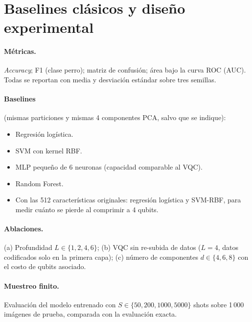 \documentclass[11pt,letterpaper]{article}
\begin{document}
\section{Baselines clásicos y diseño experimental}
\paragraph{Métricas.} \emph{Accuracy}; F1 (clase perro); matriz de confusión; área bajo la curva
ROC (AUC). Todas se reportan con media y desviación estándar sobre tres semillas.

\paragraph{Baselines} (mismas particiones y mismas 4 componentes PCA, salvo que se indique):
\begin{itemize}[leftmargin=*]
\item Regresión logística.
\item SVM con kernel RBF.
\item MLP pequeño de 6 neuronas (capacidad comparable al VQC).
\item Random Forest.
\item Con las 512 características originales: regresión logística y SVM-RBF, para medir cuánto se
pierde al comprimir a 4 qubits.
\end{itemize}

\paragraph{Ablaciones.} (a) Profundidad $L\in\{1,2,4,6\}$; (b) VQC sin re-subida de datos
($L=4$, datos codificados solo en la primera capa); (c) número de componentes $d\in\{4,6,8\}$ con
el costo de qubits asociado.

\paragraph{Muestreo finito.} Evaluación del modelo entrenado con $S\in\{50,200,1000,5000\}$ shots
sobre 1\,000 imágenes de prueba, comparada con la evaluación exacta.

\end{document}

